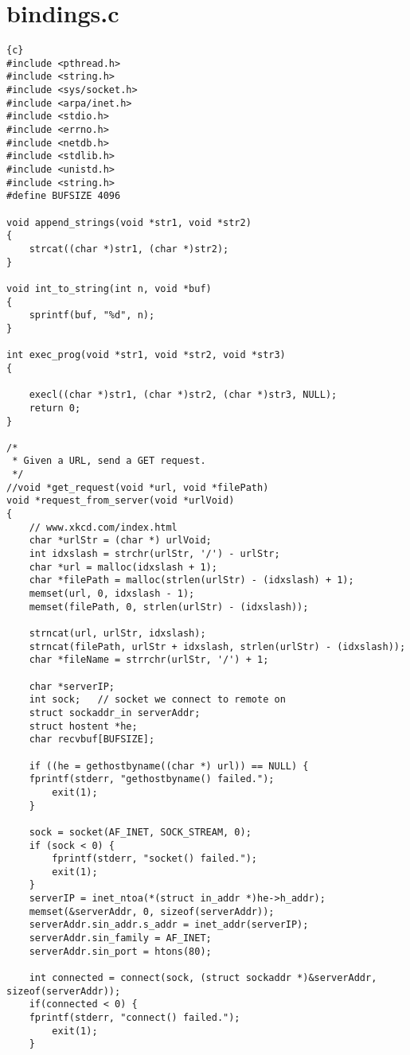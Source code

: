 \section{bindings.c}
\begin{lstlisting}{c}
#include <pthread.h>
#include <string.h>
#include <sys/socket.h>
#include <arpa/inet.h>
#include <stdio.h>
#include <errno.h>
#include <netdb.h>
#include <stdlib.h>
#include <unistd.h>
#include <string.h>
#define BUFSIZE 4096

void append_strings(void *str1, void *str2)
{
    strcat((char *)str1, (char *)str2);
}

void int_to_string(int n, void *buf)
{
    sprintf(buf, "%d", n);
}

int exec_prog(void *str1, void *str2, void *str3)
{

    execl((char *)str1, (char *)str2, (char *)str3, NULL);
    return 0;
}

/*
 * Given a URL, send a GET request.
 */
//void *get_request(void *url, void *filePath)
void *request_from_server(void *urlVoid)
{
    // www.xkcd.com/index.html
    char *urlStr = (char *) urlVoid;
    int idxslash = strchr(urlStr, '/') - urlStr;
    char *url = malloc(idxslash + 1);
    char *filePath = malloc(strlen(urlStr) - (idxslash) + 1);
    memset(url, 0, idxslash - 1);
    memset(filePath, 0, strlen(urlStr) - (idxslash));

    strncat(url, urlStr, idxslash);
    strncat(filePath, urlStr + idxslash, strlen(urlStr) - (idxslash));
    char *fileName = strrchr(urlStr, '/') + 1;

    char *serverIP;
    int sock;   // socket we connect to remote on
    struct sockaddr_in serverAddr;
    struct hostent *he;
    char recvbuf[BUFSIZE];

    if ((he = gethostbyname((char *) url)) == NULL) {
	fprintf(stderr, "gethostbyname() failed.");
        exit(1);
    }

    sock = socket(AF_INET, SOCK_STREAM, 0);
    if (sock < 0) {
        fprintf(stderr, "socket() failed.");
        exit(1);
    }
    serverIP = inet_ntoa(*(struct in_addr *)he->h_addr);
    memset(&serverAddr, 0, sizeof(serverAddr));
    serverAddr.sin_addr.s_addr = inet_addr(serverIP);
    serverAddr.sin_family = AF_INET;
    serverAddr.sin_port = htons(80);

    int connected = connect(sock, (struct sockaddr *)&serverAddr, sizeof(serverAddr));
    if(connected < 0) {
	fprintf(stderr, "connect() failed.");
        exit(1);
    }


\end{lstlisting}
